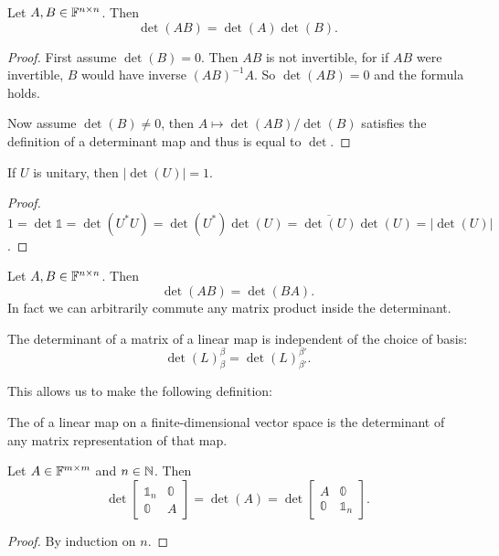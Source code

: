 \begin{proposition}
Let $A,B\in\mathbb{F}^{n\times n}$. Then
\[ \det(AB) = \det(A)\det(B). \]
\end{proposition}
\begin{proof}
First assume $\det(B) = 0$. Then $AB$ is not invertible, for if $AB$ were invertible, $B$ would have inverse $(AB)^{-1}A$. So $\det(AB) = 0$ and the formula holds.

Now assume $\det(B) \neq 0$, then $A\mapsto \det(AB)/\det(B)$ satisfies the definition of a determinant map and thus is equal to $\det$.
\end{proof}
\begin{corollary}
If $U$ is unitary, then $|\det(U)| = 1$.
\end{corollary}
\begin{proof}
$1=\det{\mathbb{1}} = \det(U^*U) = \det(U^*)\det(U) = \overline{\det(U)}\det(U) = |\det(U)|$.
\end{proof}
\begin{corollary}
Let $A,B\in\mathbb{F}^{n\times n}$. Then
\[ \det(AB) = \det(BA). \]
In fact we can arbitrarily commute any matrix product inside the determinant.
\end{corollary}
\begin{corollary}
The determinant of a matrix of a linear map is independent of the choice of basis:
\[ \det(L)_{\beta}^{\beta} = \det(L)_{\beta'}^{\beta'}. \]
\end{corollary}
This allows us to make the following definition:
\begin{definition}
The  of a linear map on a finite-dimensional vector space is the determinant of any matrix representation of that map.
\end{definition}

\begin{lemma}
Let $A\in\mathbb{F}^{m\times m}$ and $n\in\mathbb{N}$. Then
\[ \det\begin{bmatrix}
\mathbb{1}_n & \mathbb{0} \\ \mathbb{0} & A
\end{bmatrix} = \det(A) = \det\begin{bmatrix}
A & \mathbb{0} \\ \mathbb{0} & \mathbb{1}_n
\end{bmatrix}. \]
\end{lemma}
\begin{proof}
By induction on $n$.
\end{proof}

